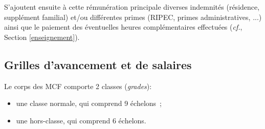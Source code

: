 S'ajoutent ensuite \`a cette r\'emun\'eration principale diverses indemnit\'es
(r\'esidence, suppl\'ement familial)
et/ou diff\'erentes primes (RIPEC, primes administratives, ...)
ainsi que le paiement des \'eventuelles heures compl\'emen\-taires effectu\'ees
({\em cf.}, Section \ref{enseignement}).


\subsection{Grilles d'avancement et de salaires}\label{sec. grilles}

Le corps des MCF comporte 2 classes
(\textit{grades}):
\begin{itemize}
\item une classe normale, qui comprend 9 \'echelons~;
\item une hors-classe, qui comprend 6 \'echelons.
\end{itemize}

